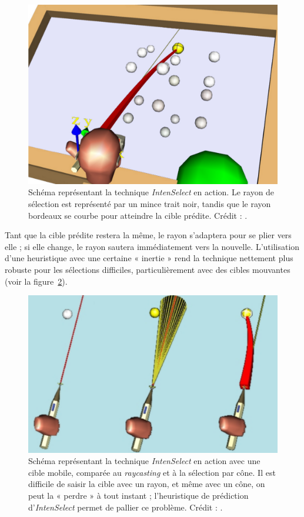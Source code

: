 	\begin{figure}[H]
		\centering
		\includegraphics[width=\textwidth]{figures/ch2/intenSnap}
		\caption[\emph{IntenSelect} --- \emph{Snapping feedback}]{Schéma représentant la technique \emph{IntenSelect} en action. Le rayon de sélection est représenté par un mince trait noir, tandis que le rayon bordeaux se courbe pour atteindre la cible prédite. Crédit : \cite{de2005intenselect}.}
		\label{fig:intenSnap}
	\end{figure}
	
	Tant que la cible prédite restera la même, le rayon s'adaptera pour se plier vers elle ; si elle change, le rayon sautera immédiatement vers la nouvelle. L'utilisation d'une heuristique avec une certaine « inertie » rend la technique nettement plus robuste pour les sélections difficiles, particulièrement avec des cibles mouvantes (voir la figure~\ref{fig:intenSnap2}).
	
	\begin{figure}[ht]
		\centering
		\includegraphics[width=\textwidth]{figures/ch2/intenSnap2}
		\caption[\emph{IntenSelect} --- \emph{Snapping feedback} II]{Schéma représentant la technique \emph{IntenSelect} en action avec une cible mobile, comparée au \emph{raycasting} et à la sélection par cône. Il est difficile de saisir la cible avec un rayon, et même avec un cône, on peut la « perdre » à tout instant ; l'heuristique de prédiction d'\emph{IntenSelect} permet de pallier ce problème. Crédit : \cite{de2005intenselect}.}
		\label{fig:intenSnap2}
	\end{figure}
	
